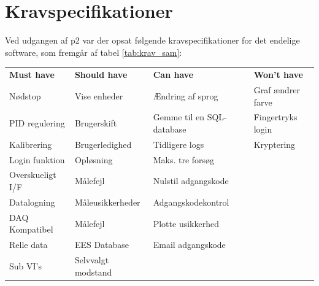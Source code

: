 \documentclass[Hovedrapport.tex]{subfiles}
\begin{document}
\section{Kravspecifikationer}
    \label{sec:specs_p24}
Ved udgangen af p2 var der opsat følgende kravspecifikationer for det endelige software, som fremgår af tabel \ref{tab:krav_sam}:
\begin{table}[H]
	\centering
	\begin{tabular}{|l|l|l|l|} \toprule 
\textbf{Must have}      & \textbf{Should have}          & \textbf{Can have}                     & \textbf{Won't have} \\ \cline{1-4}

Nødstop \cellcolor{green!25}        & Vise enheder\cellcolor{green!25} & Ændring af sprog\cellcolor{red!25}                      & Graf ændrer farve \cellcolor{red!25} \\
PID regulering \cellcolor{green!25} & Brugerskift\cellcolor{green!25}   & Gemme til en SQL-database\cellcolor{red!25}             & Fingertryks login \cellcolor{red!25}     \\
Kalibrering \cellcolor{blue!25}      & Brugerledighed\cellcolor{green!25}                & Tidligere logs\cellcolor{green!25}                        & Kryptering \cellcolor{red!25}            \\
Login funktion \cellcolor{green!25} & Opløsning\cellcolor{orange!25}                     & Maks. tre forsøg \cellcolor{orange!25}                      &       \\
Overskueligt I/F \cellcolor{blue!25}    & Målefejl\cellcolor{blue!25}                      & Nulstil adgangskode \cellcolor{orange!25}                     &                       \\
Datalogning \cellcolor{green!25}         & Måleusikkerheder \cellcolor{blue!25}              & Adgangskodekontrol \cellcolor{green!25}                    &                       \\  
DAQ Kompatibel \cellcolor{blue!25}      & Målefejl\cellcolor{blue!25}                               & Plotte usikkerhed \cellcolor{orange!25}                     &                       \\
Relle data \cellcolor{blue!25}          & \cellcolor{yellow!25} EES Database                              & \cellcolor{green!25} Email adgangskode                                       &                       \\
Sub VI's \cellcolor{green!25}            & \cellcolor{yellow!25}Selvvalgt modstand                              &                                       &                       \\ 

\end{tabular}
\end{table}
\end{document}
